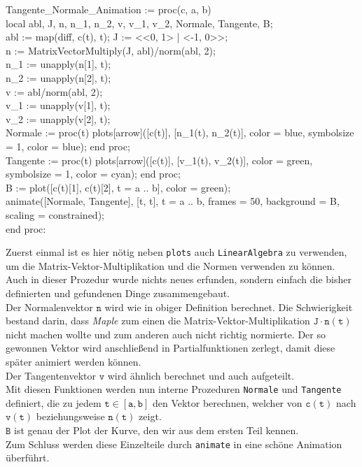 \documentclass[12pt]{article}
\newenvironment{Code}{\begin{mdframed}[topline=false,bottomline=false,linewidth=1pt]\begin{scriptsize}\begin{tt}}
{\end{tt}\end{scriptsize}\end{mdframed}}
\begin{document}
\begin{Code}
Tangente\_Normale\_Animation := proc(c, a, b)\\
local abl, J, n, n\_1, n\_2, v, v\_1, v\_2, Normale, Tangente, B;\\
abl := map(diff, c(t), t); J := <<0, 1> | <-1, 0>>;\\
n := MatrixVectorMultiply(J, abl)/norm(abl, 2);\\
n\_1 := unapply(n[1], t);\\
n\_2 := unapply(n[2], t);\\
v := abl/norm(abl, 2);\\
v\_1 := unapply(v[1], t);\\
v\_2 := unapply(v[2], t);\\
Normale := proc(t) plots[arrow]([c(t)], [n\_1(t), n\_2(t)], color = blue, symbolsize = 1, color = blue); end proc;\\
Tangente := proc(t) plots[arrow]([c(t)], [v\_1(t), v\_2(t)], color = green, symbolsize = 1, color = cyan); end proc;\\
B := plot([c(t)[1], c(t)[2], t = a .. b], color = green);\\
animate([Normale, Tangente], [t, t], t = a .. b, frames = 50, background = B, scaling = constrained);\\
end proc:
\end{Code}

Zuerst einmal ist es hier nötig neben \texttt{plots} auch \texttt{LinearAlgebra} zu verwenden, um die Matrix-Vektor-Multiplikation und die Normen verwenden zu können.\\
Auch in dieser Prozedur wurde nichts neues erfunden, sondern einfach die bisher definierten und gefundenen Dinge zusammengebaut.\\
Der Normalenvektor $\mathtt{n}$ wird wie in obiger Definition berechnet. Die Schwierigkeit bestand darin, dass \textit{Maple} zum einen die Matrix-Vektor-Multiplikation $\mathtt{J \cdot n(t)}$ nicht machen wollte und zum anderen auch nicht richtig normierte. Der so gewonnen Vektor wird anschließend in Partialfunktionen zerlegt, damit diese später animiert werden können.\\
Der Tangentenvektor $\mathtt{v}$ wird ähnlich berechnet und auch aufgeteilt.\\
Mit diesen Funktionen werden nun interne Prozeduren \texttt{Normale} und \texttt{Tangente} definiert, die zu jedem $\mathtt{t \in [a,b]}$ den Vektor berechnen, welcher von $\mathtt{c(t)}$ nach $\mathtt{v(t)}$ beziehungsweise $\mathtt{n(t)}$ zeigt.\\
$\mathtt{B}$ ist genau der Plot der Kurve, den wir aus dem ersten Teil kennen.\\
Zum Schluss werden diese Einzelteile durch \texttt{animate} in eine schöne Animation überführt.\\
\end{document}
